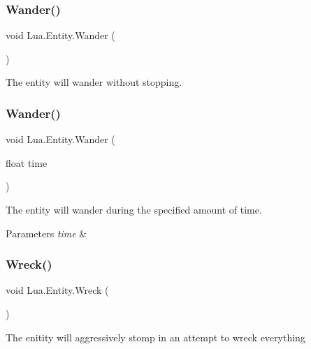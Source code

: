 \subsubsection{\texorpdfstring{Wander()}{Wander()}\hspace{0.1cm}{\footnotesize\ttfamily [1/2]}}
{\footnotesize\ttfamily void Lua.\+Entity.\+Wander (\begin{DoxyParamCaption}{ }\end{DoxyParamCaption})}



The entity will wander without stopping. 

\mbox{\label{class_lua_1_1_entity_a9858a940de17a0405da24bff1d834970}} 
\subsubsection{\texorpdfstring{Wander()}{Wander()}\hspace{0.1cm}{\footnotesize\ttfamily [2/2]}}
{\footnotesize\ttfamily void Lua.\+Entity.\+Wander (\begin{DoxyParamCaption}\item[{float}]{time }\end{DoxyParamCaption})}



The entity will wander during the specified amount of time. 


\begin{DoxyParams}{Parameters}
{\em time} & \\
\hline
\end{DoxyParams}
\mbox{\label{class_lua_1_1_entity_a5690c11c287139f6d5b5171f5d4189e9}} 
\subsubsection{\texorpdfstring{Wreck()}{Wreck()}}
{\footnotesize\ttfamily void Lua.\+Entity.\+Wreck (\begin{DoxyParamCaption}{ }\end{DoxyParamCaption})}



The enitity will aggressively stomp in an attempt to wreck everything 



